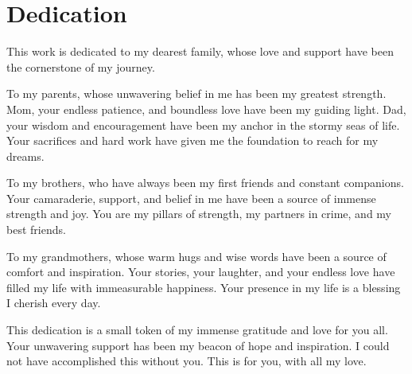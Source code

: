 \chapter*{Dedication}

This work is dedicated to my dearest family, whose love and support have been the cornerstone of my journey. 
\vspace{10pt}

To my parents, whose unwavering belief in me has been my greatest strength. Mom, your endless patience, and boundless love have been my guiding light. Dad, your wisdom and encouragement have been my anchor in the stormy seas of life. Your sacrifices and hard work have given me the foundation to reach for my dreams.
\vspace{10pt}

To my brothers, who have always been my first friends and constant companions. Your camaraderie, support, and belief in me have been a source of immense strength and joy. You are my pillars of strength, my partners in crime, and my best friends.
\vspace{10pt}

To my grandmothers, whose warm hugs and wise words have been a source of comfort and inspiration. Your stories, your laughter, and your endless love have filled my life with immeasurable happiness. Your presence in my life is a blessing I cherish every day.
\vspace{10pt}

This dedication is a small token of my immense gratitude and love for you all. Your unwavering support has been my beacon of hope and inspiration. I could not have accomplished this without you. This is for you, with all my love.
